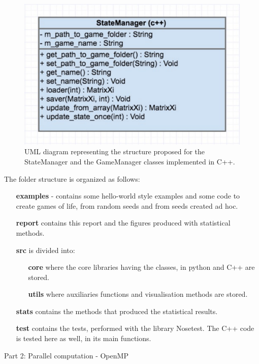 \documentclass[11pt, twoside]{article}
\begin{document}
\begin{figure}[htbp]
	\centering
	\includegraphics[scale=0.45]{figures/uml_cpp.pdf}
	\caption{UML diagram representing the structure proposed for the StateManager and the GameManager classes implemented in C++.}
	\label{fig:uml_cpp}
\end{figure}

\noindent
The folder structure is organized as follows:
\begin{itemize}
	\item[{\bf examples}] - contains some hello-world style examples and some code to create games of life, from random seeds and from seeds created ad hoc.
	\item[{\bf report}] contains this report and the figures produced with statistical methods.
	\item[{\bf src}] is divided into:
	\begin{itemize}
		\item[{\bf core}] where the core libraries having the classes, in python and C++ are stored.
		\item[{\bf utils}] where auxiliaries functions and visualisation methods are stored.
	\end{itemize}
	\item[{\bf stats}] contains the methods that produced the statistical results.
	\item[{\bf test}] contains the tests, performed with the library Nosetest. The C++ code is tested here as well, in its main functions.
\end{itemize}

\begin{center}
	\color{MidnightBlue} {\Large Part 2: Parallel computation - OpenMP }\color{Black} 
\end{center}
\end{document}
